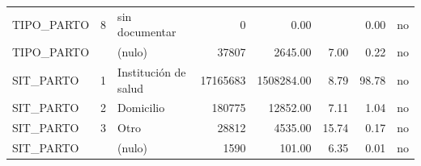 \begin{tabular}{lllrrrrr}
TIPO\_PARTO & 8 & sin documentar & 0 & 0.00 &  & 0.00 & no \\
TIPO\_PARTO &  & (nulo) & 37807 & 2645.00 & 7.00 & 0.22 & no \\
SIT\_PARTO & 1 & Institución de salud & 17165683 & 1508284.00 & 8.79 & 98.78 & no \\
SIT\_PARTO & 2 & Domicilio & 180775 & 12852.00 & 7.11 & 1.04 & no \\
SIT\_PARTO & 3 & Otro & 28812 & 4535.00 & 15.74 & 0.17 & no \\
SIT\_PARTO &  & (nulo) & 1590 & 101.00 & 6.35 & 0.01 & no \\
\bottomrule
\end{tabular}
